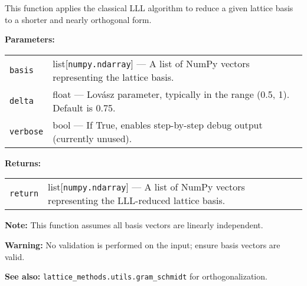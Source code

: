 \documentclass[a4paper,12pt]{article}
\begin{document}
This function applies the classical LLL algorithm to reduce a given lattice basis
to a shorter and nearly orthogonal form.

\vspace{1em}
\noindent
\textbf{Parameters:}

\vspace{0.5em}
\begin{tabular}{p{3cm} p{11cm}}
\texttt{basis} & list[\texttt{numpy.ndarray}] — A list of NumPy vectors representing the lattice basis. \\
\texttt{delta} & float — Lovász parameter, typically in the range (0.5, 1). Default is 0.75. \\
\texttt{verbose} & bool — If True, enables step-by-step debug output (currently unused). \\
\end{tabular}

\vspace{1em}
\noindent
\textbf{Returns:}

\vspace{0.5em}
\begin{tabular}{p{3cm} p{11cm}}
\texttt{return} & list[\texttt{numpy.ndarray}] — A list of NumPy vectors representing the LLL-reduced lattice basis. \\
\end{tabular}

\vspace{1em}
\noindent
\textbf{Note:}  
This function assumes all basis vectors are linearly independent.

\vspace{1em}
\noindent
\textbf{Warning:}  
No validation is performed on the input; ensure basis vectors are valid.

\vspace{1em}
\noindent
\textbf{See also:}  
\texttt{lattice\_methods.utils.gram\_schmidt} for orthogonalization.
\end{document}
